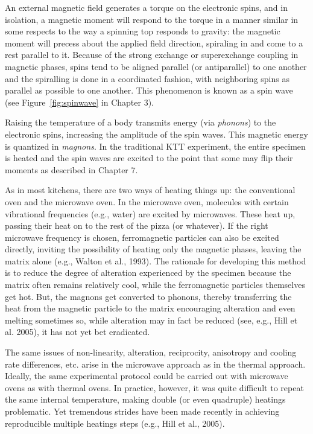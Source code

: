    An external magnetic field generates a torque on the electronic spins, and in isolation, a magnetic moment will respond to the torque in a manner similar in some respects to  the way a spinning top responds to gravity: the magnetic moment will precess about the applied field direction, spiraling in  and come to a rest parallel to it. Because of the strong exchange or superexchange coupling  in magnetic phases, spins tend to be aligned parallel (or antiparallel) to one another and the spiralling is done in a coordinated fashion, with neighboring spins as parallel as possible to one another.  This phenomenon is known as a 
 spin wave  (see Figure~\ref{fig:spinwave} in Chapter 3).  
 
 Raising the temperature of a body transmits energy (via {\it phonons})  to the electronic spins, increasing the amplitude of the spin waves.   This  magnetic energy is quantized in {\it magnons}.    In the traditional KTT experiment, the entire specimen is heated and the spin waves are excited to the point that some may flip their moments as described in  Chapter  7. 
 
  
 As in most kitchens, there are two ways of heating things up: the conventional oven and the microwave oven.  In the microwave oven, molecules with certain vibrational frequencies (e.g., water) are excited by 
 microwaves.  These heat up, passing their heat on  to the rest of the pizza (or whatever).  If the right microwave frequency is chosen, ferromagnetic particles can also be excited directly, inviting the possibility of heating only the magnetic phases, leaving the matrix alone (e.g., 
 Walton et al., 1993).  \nocite{walton93} The rationale for developing this method is to reduce the degree of alteration experienced by the specimen  because the matrix often remains relatively cool, while the ferromagnetic particles themselves get hot.  But, the magnons get converted to phonons, thereby transferring the heat from the magnetic particle to the matrix encouraging alteration and even melting sometimes so, while alteration may in fact be reduced (see, e.g., 
 Hill et al. 2005), it has not yet bet eradicated.  \nocite{hill05}
 
The same issues of non-linearity, alteration,  reciprocity, anisotropy and cooling rate differences, etc.  arise in the microwave approach as in the thermal approach.  Ideally, the same experimental protocol could be carried out with microwave ovens as with thermal ovens.  In practice, however, it was quite difficult to repeat the same internal temperature,  making double (or even quadruple) heatings problematic.  Yet tremendous strides have been made recently in achieving reproducible multiple heatings steps (e.g., 
 Hill et al., 2005).  \nocite{hill05}

